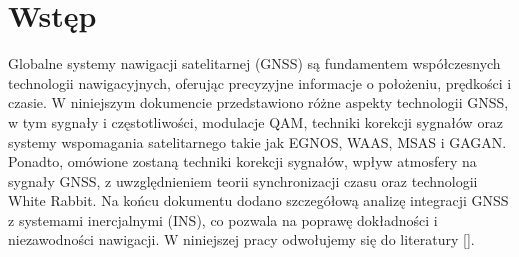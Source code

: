 
\section{Wstęp}

Globalne systemy nawigacji satelitarnej (GNSS) są fundamentem współczesnych technologii nawigacyjnych, oferując precyzyjne informacje o położeniu, prędkości i czasie. W niniejszym dokumencie przedstawi\-ono różne aspekty technologii GNSS, w tym sygnały i częstotliwości, modulacje QAM, techniki korekcji sygnałów oraz systemy wspomagania satelitarnego takie jak EGNOS, WAAS, MSAS i GAGAN. Ponadto, omówione zostaną techniki korekcji sygnałów, wpływ atmosfery na sygnały GNSS, z uwzględnieniem teorii synchronizacji czasu oraz technologii White Rabbit. Na końcu dokumentu dodano szczegółową analizę integracji GNSS z systemami inercjalnymi (INS), co pozwala na poprawę dokładności i niezawodności nawigacji.
W niniejszej pracy odwołujemy się do literatury [\cite{examplebook}].
